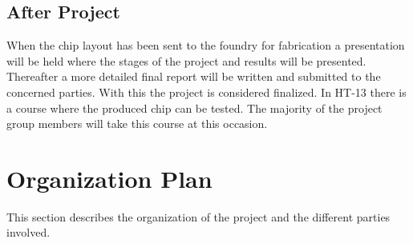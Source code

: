 \documentclass[a4paper,12pt]{article} \usepackage{graphicx}
\begin{document}
\subsection{After Project}
When the chip layout has been sent to the foundry for fabrication a presentation
will be held where the stages of the project and results will be presented. 
Thereafter a more detailed final report will be written and submitted to the 
concerned parties. With this the project is considered finalized. In HT-13 there
is a course where the produced chip can be tested. The majority of the project
group members will take this course at this occasion.


\section{Organization Plan}
This section describes the organization of the project and the different
parties involved.
\end{document}
